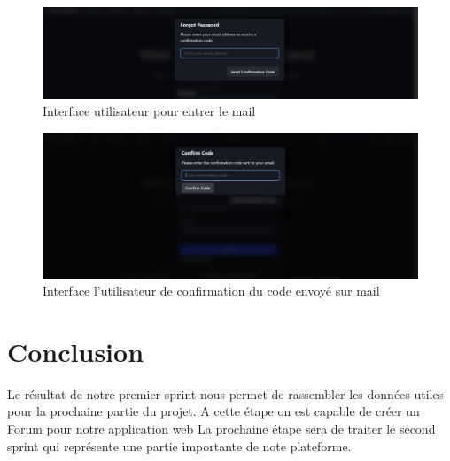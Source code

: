 \begin{figure}[h!]
    \centering
    \includegraphics[width=0.9\linewidth]{pages/images/send mail interface.png}
    \caption{Interface utilisateur pour entrer le mail }
    \label{fig:enter-label}
\end{figure}

\begin{figure}[h!]
    \centering
    \includegraphics[width=0.9\linewidth]{pages/images/confirmation code interface.png}
    \caption{Interface  l'utilisateur de confirmation du code envoyé sur mail }
    \label{fig:enter-label}
\end{figure}


\clearpage
\section{Conclusion}
Le résultat de notre premier sprint nous permet de rassembler les données utiles pour la prochaine partie du projet. 
A cette étape on est capable de créer un Forum pour notre application web
La prochaine étape sera de traiter le second sprint qui représente une partie importante de note plateforme.